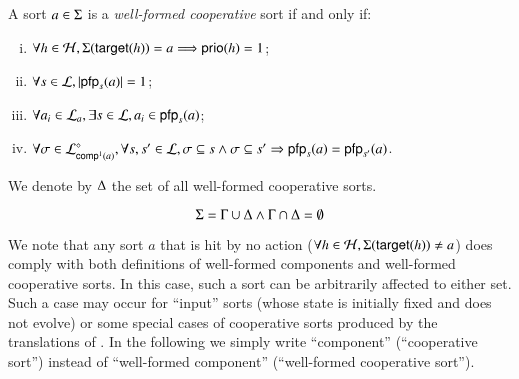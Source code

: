 \begin{definition}
\label{def:cs}
  A sort $a \in \PHs$ is a \emph{well-formed cooperative} sort if and only if:
  \begin{enumerate}[(i)]
    \item $\forall h\in\PHh, \Sigma(\PHtarget(h))=a \Longrightarrow \prio(h) = 1$;
    \item\label{csai} $\forall s\in\PHl, \card{\pfp_s(a)} = 1$;
    \item\label{css} $\forall a_i \in \PHl_a, \exists s \in \PHl, a_i\in\pfp_s(a)$;
    \item $\forall \sigma\in\PHsubl[\PHl]_{\compin(a)},
      \forall s,s'\in\PHl,
      \sigma\subseteq s\wedge \sigma\subseteq s'\Rightarrow 
      \pfp_s(a) = \pfp_{s'}(a)$\enspace.
  \end{enumerate}
  We denote by $\cs$ the set of all well-formed cooperative sorts.
\end{definition}

\begin{condition}
\label{cr:compcs}
  $$\PHs = \components \cup \cs \wedge \components \cap \cs = \emptyset$$
\end{condition}



We note that any sort $a$ that is hit by no action (\ie $\forall h \in \PHh, \PHsort(\target{h}) \neq a$)
does comply with both definitions of well-formed components and well-formed cooperative sorts.
In this case, such a sort can be arbitrarily affected to either set.
Such a case may occur for “input” sorts (whose state is initially fixed and does not evolve)
or some special cases of cooperative sorts produced by the translations of .
In the following we simply write “component” (\resp “cooperative sort”) instead of “well-formed component” (\resp “well-formed cooperative sort”).

